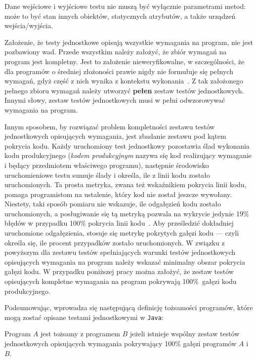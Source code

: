Dane wejściowe i wyjściowe testu nie muszą być wyłącznie parametrami metod: może to być stan innych obiektów,
statycznych atrybutów, a także urządzeń wejścia/wyjścia.

Założenie, że testy jednostkowe opisują wszystkie wymagania na program, nie jest pozbawiony wad.
Przede wszystkim należy założyć, że zbiór wymagań na program jest kompletny.
Jest to założenie nieweryfikowalne, w szczególności, że dla programów o średniej złożoności prawie nigdy nie formułuje
się pełnych wymagań, gdyż część z nich wynika z kontekstu wykonania~\cite{jkuchta2016}.
Z tak założonego pełnego zbioru wymagań należy utworzyć \textbf{pełen} zestaw testów jednostkowych.
Innymi słowy, zestaw testów jednostkowych musi w pełni odwzorowywać wymagania na program.

Innym sposobem, by rozwiązać problem kompletności zestawu testów jednostkowych opisujących wymagania, jest zbadanie
zestawu pod kątem pokrycia kodu.
Każdy uruchomiony test jednostkowy pozostawia ślad wykonania kodu produkcyjnego (\textit{kodem produkcyjnym} nazywa
się kod realizujący wymaganie i będący przedmiotem właściwego programu), następnie środowisko uruchomieniowe testu
sumuje ślady i określa, ile z linii kodu zostało uruchomionych.
Ta prosta metryka, zwana też wskaźnikiem pokrycia linii kodu, pomaga programistom na ustalenie, który kod nie został
jeszcze wywołany.
Niestety, taki sposób pomiaru nie wskazuje, ile odgałęzień kodu zostało uruchomionych, a posługiwanie się tą metryką
pozwala na wykrycie jedynie 19\% błędów w przypadku 100\% pokrycia linii kodu~\cite{7272926}.
Aby prześledzić dokładniej uruchomione odgałęzienia, stosuje się metrykę pokrytych gałęzi kodu --- czyli określa się,
ile procent przypadków zostało uruchomionych.
W związku z powyższym dla zestawu testów spełniających warunki testów jednostkowych opisujących wymagania na program
należy wskazać minimalny obszar pokrycia gałęzi kodu.
W przypadku poniższej pracy można założyć, że zestaw testów opisujących kompletne wymagania na program pokrywają
100\%~gałęzi kodu produkcyjnego.

Podsumowując, wprowadza się następującą definicję tożsamości programów, które mogą zostać opisane testami
jednostkowymi w \texttt{Java}:
\begin{definition}
    \label{def:equivalence_java}
Program \(A\) jest tożsamy z programem \(B\) jeżeli istnieje wspólny zestaw testów jednostkowych opisujących wymagania
pokrywający 100\% gałęzi programów \(A\) i \(B\).
\end{definition}

